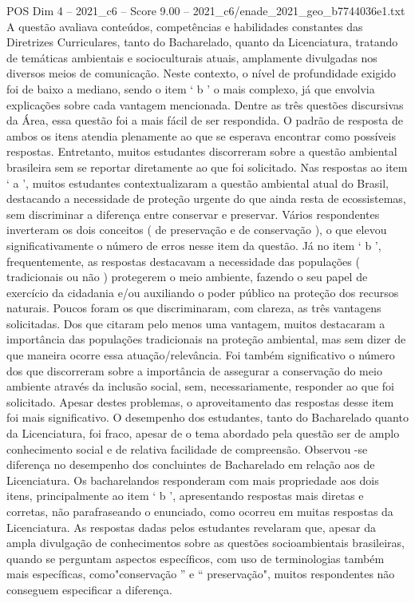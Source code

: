 \begin{textsample}{POS Dim 4 – 2021\_c6 – Score 9.00 – 2021\_c6/enade\_2021\_geo\_b7744036e1.txt}
A questão avaliava conteúdos, competências e habilidades constantes das Diretrizes Curriculares, tanto do Bacharelado, quanto da Licenciatura, tratando de temáticas ambientais e socioculturais atuais, amplamente divulgadas nos diversos meios de comunicação.
Neste contexto, o nível de profundidade exigido foi de baixo a mediano, sendo o item ‘ b ’ o mais complexo, já que envolvia explicações sobre cada vantagem mencionada.
Dentre as três questões discursivas da Área, essa questão foi a mais fácil de ser respondida.
O padrão de resposta de ambos os itens atendia plenamente ao que se esperava encontrar como possíveis respostas.
Entretanto, muitos estudantes discorreram sobre a questão ambiental brasileira sem se reportar diretamente ao que foi solicitado.
Nas respostas ao item ‘ a ’, muitos estudantes contextualizaram a questão ambiental atual do Brasil, destacando a necessidade de proteção urgente do que ainda resta de ecossistemas, sem discriminar a diferença entre conservar e preservar.
Vários respondentes inverteram os dois conceitos ( de preservação e de conservação ), o que elevou significativamente o número de erros nesse item da questão.
Já no item ‘ b ’, frequentemente, as respostas destacavam a necessidade das populações ( tradicionais ou não ) protegerem o meio ambiente, fazendo o seu papel de exercício da cidadania e/ou auxiliando o poder público na proteção dos recursos naturais.
Poucos foram os que discriminaram, com clareza, as três vantagens solicitadas.
Dos que citaram pelo menos uma vantagem, muitos destacaram a importância das populações tradicionais na proteção ambiental, mas sem dizer de que maneira ocorre essa atuação/relevância.
Foi também significativo o número dos que discorreram sobre a importância de assegurar a conservação do meio ambiente através da inclusão social, sem, necessariamente, responder ao que foi solicitado.
Apesar destes problemas, o aproveitamento das respostas desse item foi mais significativo.
O desempenho dos estudantes, tanto do Bacharelado quanto da Licenciatura, foi fraco, apesar de o tema abordado pela questão ser de amplo conhecimento social e de relativa facilidade de compreensão.
Observou -se diferença no desempenho dos concluintes de Bacharelado em relação aos de Licenciatura.
Os bacharelandos responderam com mais propriedade aos dois itens, principalmente ao item ‘ b ’, apresentando respostas mais diretas e corretas, não parafraseando o enunciado, como ocorreu em muitas respostas da Licenciatura.
As respostas dadas pelos estudantes revelaram que, apesar da ampla divulgação de conhecimentos sobre as questões socioambientais brasileiras, quando se perguntam aspectos específicos, com uso de terminologias também mais específicas, como"conservação ” e “ preservação", muitos respondentes não conseguem especificar a diferença.

\end{textsample}

